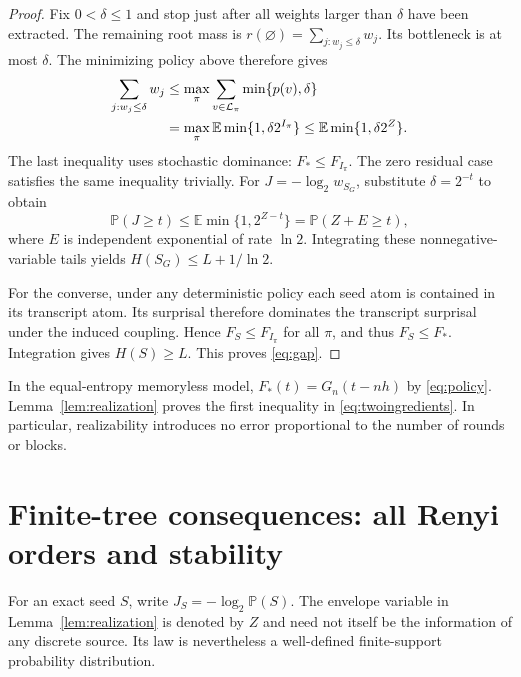 \documentclass[11pt,a4paper]{article}
\newcommand{\E}{\mathbb E}
\newcommand{\Prob}{\mathbb P}
\begin{document}
\begin{proof}
Fix $0<\delta\le1$ and stop just after all weights larger than $\delta$
have been extracted. The remaining root mass is
$r(\varnothing)=\sum_{j:w_j\le\delta}w_j$. Its bottleneck is at most
$\delta$. The minimizing policy above therefore gives
\begin{align}
\sum_{j:w_j\le\delta}w_j
&\le\max_\pi\sum_{v\in\mathcal L_\pi}\min\{p(v),\delta\}\notag\\
&=\max_\pi\E\min\{1,\delta2^{I_\pi}\}
\le\E\min\{1,\delta2^Z\}.\label{eq:softtail}
\end{align}
The last inequality uses stochastic dominance: $F_*\le F_{I_\pi}$.
The zero residual case satisfies the same inequality trivially.
For $J=-\log_2w_{S_G}$, substitute $\delta=2^{-t}$ to obtain
\[
\Prob(J\ge t)\le\E\min\{1,2^{Z-t}\}
=\Prob(Z+E\ge t),
\]
where $E$ is independent exponential of rate $\ln2$. Integrating these
nonnegative-variable tails yields $H(S_G)\le L+1/\ln2$.

For the converse, under any deterministic policy each seed atom is
contained in its transcript atom. Its surprisal therefore dominates
the transcript surprisal under the induced coupling. Hence
$F_S\le F_{I_\pi}$ for all $\pi$, and thus $F_S\le F_*$. Integration
gives $H(S)\ge L$. This proves \eqref{eq:gap}.
\end{proof}

In the equal-entropy memoryless model, $F_*(t)=G_n(t-nh)$ by
\eqref{eq:policy}. Lemma~\ref{lem:realization} proves the first
inequality in \eqref{eq:twoingredients}. In particular, realizability
introduces no error proportional to the number of rounds or blocks.


\section{Finite-tree consequences: all Renyi orders and stability}
For an exact seed $S$, write $J_S=-\log_2\Prob(S)$. The envelope variable
in Lemma~\ref{lem:realization} is denoted by $Z$ and need not itself be
the information of any discrete source. Its law is nevertheless a
well-defined finite-support probability distribution.
\end{document}
